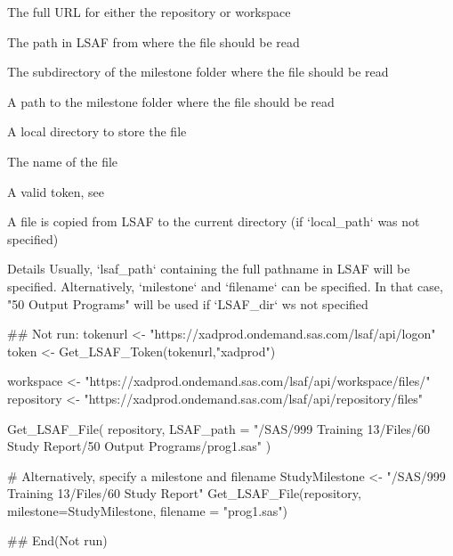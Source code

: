 \documentclass[a4paper]{book}
\begin{document}
\begin{Arguments}
\begin{ldescription}
\item[\code{LSAF\_area}] The full URL for either the repository or workspace

\item[\code{LSAF\_path}] The path in LSAF from where the file should be read

\item[\code{LSAF\_dir}] The subdirectory of the milestone folder where the file should
be read

\item[\code{milestone}] A path to the milestone folder where the file should be read

\item[\code{local\_path}] A local directory to store the file

\item[\code{filename}] The name of the file

\item[\code{token}] A valid token, see 
\end{ldescription}
\end{Arguments}
%
\begin{Value}
A file is copied from LSAF to the current directory (if `local\_path`
was not specified)
\end{Value}
%
\begin{Section}{Details}
Usually, `lsaf\_path` containing the full pathname in LSAF
will be specified. Alternatively, `milestone` and `filename` can be specified.
In that case, "50 Output Programs" will be used if `LSAF\_dir` ws not specified
\end{Section}
%
\begin{Examples}
\begin{ExampleCode}
## Not run: 
 tokenurl <- "https://xadprod.ondemand.sas.com/lsaf/api/logon"
 token <- Get_LSAF_Token(tokenurl,"xadprod")

 workspace <- "https://xadprod.ondemand.sas.com/lsaf/api/workspace/files/"
 repository <- "https://xadprod.ondemand.sas.com/lsaf/api/repository/files"

 Get_LSAF_File(
   repository,
   LSAF_path = "/SAS/999 Training 13/Files/60 Study Report/50 Output Programs/prog1.sas"
 )

 # Alternatively, specify a milestone and filename
 StudyMilestone <- "/SAS/999 Training 13/Files/60 Study Report"
 Get_LSAF_File(repository, milestone=StudyMilestone, filename = "prog1.sas")

## End(Not run)
\end{ExampleCode}
\end{Examples}
\end{document}
